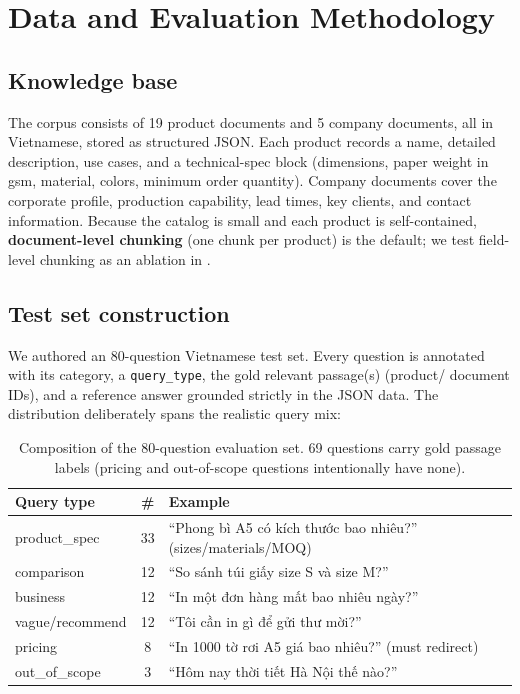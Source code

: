 \section{Data and Evaluation Methodology}
\label{sec:methodology}

\subsection{Knowledge base}
The corpus consists of 19 product documents and 5 company documents, all in
Vietnamese, stored as structured JSON. Each product records a name, detailed
description, use cases, and a technical-spec block (dimensions, paper weight in
gsm, material, colors, minimum order quantity). Company documents cover the
corporate profile, production capability, lead times, key clients, and contact
information. Because the catalog is small and each product is self-contained,
\textbf{document-level chunking} (one chunk per product) is the default; we test
field-level chunking as an ablation in .

\subsection{Test set construction}
\label{sec:testset}
We authored an 80-question Vietnamese test set. Every question is annotated with
its category, a \texttt{query\_type}, the gold relevant passage(s) (product/
document IDs), and a reference answer grounded strictly in the JSON data. The
distribution deliberately spans the realistic query mix:

\begin{table}[H]
\centering\small
\begin{tabular}{lcp{8.2cm}}
\toprule
\textbf{Query type} & \textbf{\#} & \textbf{Example} \\
\midrule
product\_spec   & 33 & ``Phong bì A5 có kích thước bao nhiêu?'' (sizes/materials/MOQ) \\
comparison      & 12 & ``So sánh túi giấy size S và size M?'' \\
business        & 12 & ``In một đơn hàng mất bao nhiêu ngày?'' \\
vague/recommend & 12 & ``Tôi cần in gì để gửi thư mời?'' \\
pricing         & 8  & ``In 1000 tờ rơi A5 giá bao nhiêu?'' (must redirect) \\
out\_of\_scope  & 3  & ``Hôm nay thời tiết Hà Nội thế nào?'' \\
\bottomrule
\end{tabular}
\caption{Composition of the 80-question evaluation set. 69 questions carry gold
passage labels (pricing and out-of-scope questions intentionally have none).}
\label{tab:testset}
\end{table}

